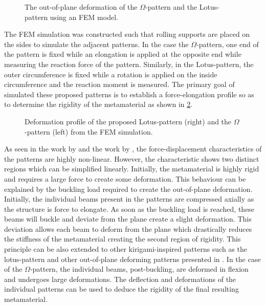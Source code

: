 \begin{figure}[hbt!]
    \centering
    \resizebox{0.48\textwidth}{!}{}
    \resizebox{0.48\textwidth}{!}{}
    \caption{The out-of-plane deformation of the $\Omega$-pattern and the Lotus-pattern using an FEM model.}
    \label{fig:kirigami-patterns-deformed}
\end{figure}

The FEM simulation was constructed such that rolling supports are placed on the sides to simulate the adjacent patterns. In the case the $\Omega$-pattern, one end of the pattern is fixed while an elongation is applied at the opposite end while measuring the reaction force of the pattern. Similarly, in the Lotus-pattern, the outer circumference is fixed while a rotation is applied on the inside circumference and the reaction moment is measured. The primary goal of simulated these proposed patterns is to establish a force-elongation profile so as to determine the rigidity of the metamaterial as shown in \cref{fig:kirigami-patterns-fem-results}.

\begin{figure}[hbt!]
    \centering
    \resizebox{0.9\textwidth}{!}{}
    \caption{Deformation profile of the proposed Lotus-pattern (right) and the $\Omega$-pattern (left) from the FEM simulation.}
    \label{fig:kirigami-patterns-fem-results}
\end{figure}

As seen in the work by \cite{shyuKirigamiApproachEngineering2015} and the work by \cite{firouzehDesignModelingNovel2015}, the force-displacement characteristics of the patterns are highly non-linear. However, the characteristic shows two distinct regions which can be simplified linearly. Initially, the metamaterial is highly rigid and requires a large force to create some deformation. This behaviour can be explained by the buckling load required to create the out-of-plane deformation. Initially, the individual beams present in the patterns are compressed axially as the structure is force to elongate. As soon as the buckling load is reached, these beams will buckle and deviate from the plane create a slight deformation. This deviation allows each beam to deform from the plane which drastically reduces the stiffness of the metamaterial creating the second region of rigidity. This principle can be also extended to other kirigami-inspired patterns such as the lotus-pattern and other out-of-plane deforming patterns presented in \cite{shyuKirigamiApproachEngineering2015}. In the case of the $\Omega$-pattern, the individual beams, post-buckling, are deformed in flexion and undergoes large deformations. The deflection and deformations of the individual patterns can be used to deduce the rigidity of the final resulting metamaterial.

